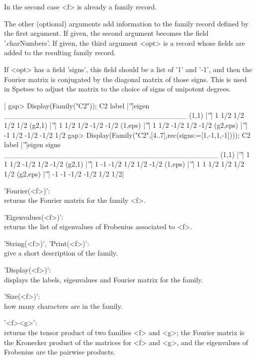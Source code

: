 In the second case <f> is already a family record.

The other (optional) arguments add information to the family record defined
by  the first  argument. If  given, the  second argument  becomes the field
'.charNumbers'. If given, the third argument <opt> is a record whose fields
are added to the resulting family record.

If  <opt> has a field 'signs', this field should be a list of '1' and '-1',
and  then the Fourier matrix is conjugated  by the diagonal matrix of those
signs.  This is used in Spetses to adjust the matrix to the choice of signs
of unipotent degrees.

|    gap> Display(Family("C2"));
    C2
       label |'\|'|eigen
    ___________________________________
    (1,1)    |'\|'|    1 1/2  1/2  1/2  1/2
    (g2,1)   |'\|'|    1 1/2  1/2 -1/2 -1/2
    (1,eps)  |'\|'|    1 1/2 -1/2  1/2 -1/2
    (g2,eps) |'\|'|   -1 1/2 -1/2 -1/2  1/2
    gap> Display(Family("C2",[4..7],rec(signs:=[1,-1,1,-1])));
    C2
       label |'\|'|eigen signs
    _________________________________________
    (1,1)    |'\|'|    1     1  1/2 -1/2 1/2 -1/2
    (g2,1)   |'\|'|    1    -1 -1/2  1/2 1/2 -1/2
    (1,eps)  |'\|'|    1     1  1/2  1/2 1/2  1/2
    (g2,eps) |'\|'|   -1    -1 -1/2 -1/2 1/2  1/2|


'Fourier(<f>)':\\ returns the Fourier matrix for the family <f>.

'Eigenvalues(<f>)':\\  returns the list of eigenvalues of Frobenius associated
to <f>.

'String(<f>)', 'Print(<f>)':\\ give a short description of the family.

'Display(<f>)':\\ displays the labels, eigenvalues and Fourier matrix for the
family.

'Size(<f>)':\\ how many characters are in the family.

'<f>\*<g>':\\  returns the  tensor product  of two  families <f> and <g>; the
Fourier  matrix is the Kronecker  product of the matrices  for <f> and <g>,
and the eigenvalues of Frobenius are the pairwise products.

